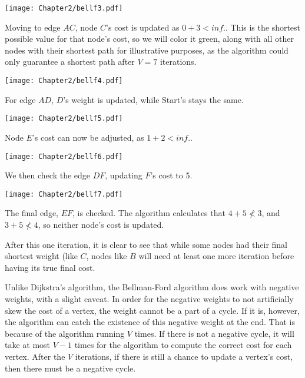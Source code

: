 \begin{center}
\texttt{[image: Chapter2/bellf3.pdf]}
\end{center}
Moving to edge $AC$, node $C$'s cost is updated as $0 + 3 < inf.$. This is the shortest possible value for that node's cost, so we will color it green, along with all other nodes with their shortest path for illustrative purposes, as the algorithm could only guarantee a shortest path after $V =7 $ iterations.

\begin{center}
\texttt{[image: Chapter2/bellf4.pdf]}
\end{center}
For edge $AD$, $D$'s weight is updated, while Start's stays the same.


\begin{center}
\texttt{[image: Chapter2/bellf5.pdf]}
\end{center}
Node $E$'s cost can now be adjusted, as $1 + 2 < inf.$. 


\begin{center}
\texttt{[image: Chapter2/bellf6.pdf]}
\end{center}
We then check the edge $DF$, updating $F$'s cost to 5.

\begin{center}
\texttt{[image: Chapter2/bellf7.pdf]}
\end{center}
The final edge, $EF$, is checked. The algorithm calculates that $4 + 5 \nless 3$, and $3 + 5 \nless 4$, so neither node's cost is updated.



After this one iteration, it is clear to see that while some nodes had their final shortest weight (like $C$, nodes like $B$ will need at least one more iteration before having its true final cost.


Unlike Dijkstra's algorithm, the Bellman-Ford algorithm does work with negative weights, with a slight caveat. In order for the negative weights to not artificially skew the cost of a vertex, the weight cannot be a part of a cycle. If it is, however, the algorithm can catch the existence of this negative weight at the end. That is because of the algorithm running $V$ times. If there is not a negative cycle, it will take at most $V-1$ times for the algorithm to compute the correct cost for each vertex. After the $V$ iterations, if there is still a chance to update a vertex's cost, then there must be a negative cycle.

